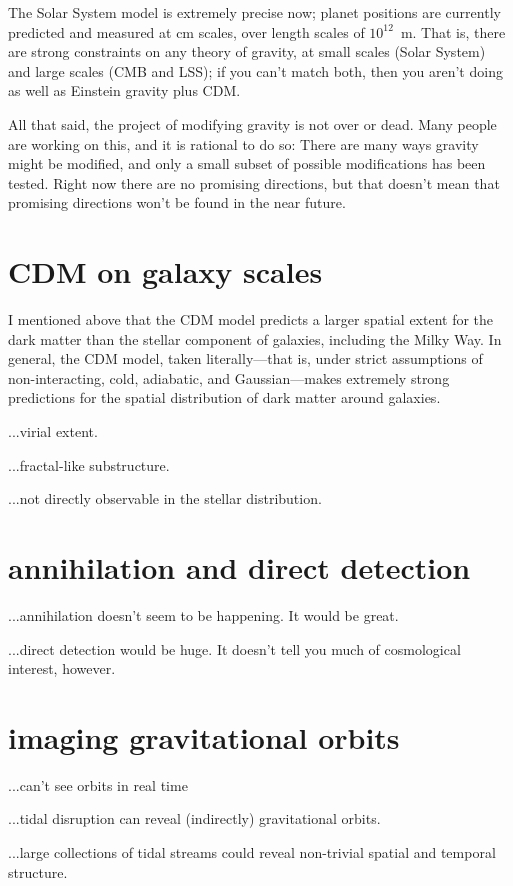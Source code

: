 \documentclass[12pt]{article}
\begin{document}
The Solar System model is extremely precise now; planet positions are
currently predicted and measured at cm scales, over length scales of
$10^12$~m.  That is, there are strong constraints on any theory of
gravity, at small scales (Solar System) and large scales (CMB and
LSS); if you can't match both, then you aren't doing as well as
Einstein gravity plus CDM.

All that said, the project of modifying gravity is not over or dead.
Many people are working on this, and it is rational to do so: There
are many ways gravity might be modified, and only a small subset of
possible modifications has been tested.  Right now there are no
promising directions, but that doesn't mean that promising directions
won't be found in the near future.

\section{CDM on galaxy scales}

I mentioned above that the CDM model predicts a larger spatial extent
for the dark matter than the stellar component of galaxies, including
the Milky Way.  In general, the CDM model, taken literally---that is,
under strict assumptions of non-interacting, cold, adiabatic, and
Gaussian---makes extremely strong predictions for the spatial
distribution of dark matter around galaxies.

...virial extent.

...fractal-like substructure.

...not directly observable in the stellar distribution.

\section{annihilation and direct detection}

...annihilation doesn't seem to be happening.  It would be great.

...direct detection would be huge.  It doesn't tell you much of
cosmological interest, however.

\section{imaging gravitational orbits}

...can't see orbits in real time

...tidal disruption can reveal (indirectly) gravitational orbits.

...large collections of tidal streams could reveal non-trivial spatial
and temporal structure.
\end{document}
